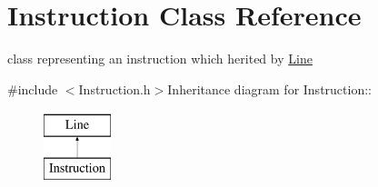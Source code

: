 \hypertarget{classInstruction}{
\section{Instruction Class Reference}
\label{classInstruction}
}


class representing an instruction which herited by \hyperlink{classLine}{Line}  


{\ttfamily \#include $<$Instruction.h$>$}Inheritance diagram for Instruction::\begin{figure}[H]
\begin{center}
\leavevmode
\includegraphics[height=2cm]{classInstruction}
\end{center}
\end{figure}
